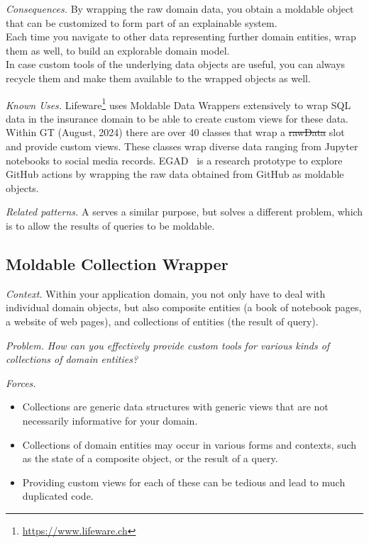 \documentclass[sigconf,screen]{acmart}
\newcommand{\pattern}[2]{\needlines{10}
\subsection*{#1}\label{pat:#2}}
\newcommand{\patref}[1]{\emph{\nameref{pat:#1}}\xspace}
\newcommand{\patsec}[1]{\noindent\textit{#1.}\xspace}
\begin{document}
\patsec{Consequences}
By wrapping the raw domain data, you obtain a moldable object that can be customized to form part of an explainable system.\\
Each time you navigate to other data representing further domain entities, wrap them as well, to build an explorable domain model.\\
In case custom tools of the underlying data objects are useful, you can always recycle them and make them available to the wrapped objects as well.

\patsec{Known Uses}
Lifeware\footnote{\url{https://www.lifeware.ch}} uses Moldable Data Wrappers extensively to wrap SQL data in the insurance domain to be able to create custom views for these data.
Within GT (August, 2024) there are over 40 classes that wrap a \st{rawData} slot and provide custom views.
These classes wrap diverse data ranging from Jupyter notebooks to social media records.
EGAD~\cite{Vale23a} is a research prototype to explore GitHub actions by wrapping the raw data obtained from GitHub as moldable objects.

\patsec{Related patterns}
A \patref{CollectionWrapper} serves a similar purpose, but solves a different problem, which is to allow the results of queries to be moldable.

\pattern{Moldable Collection Wrapper}{CollectionWrapper}

\patsec{Context}
Within your application domain, you not only have to deal with individual domain objects, but also composite entities (\eg a book of notebook pages, a website of web pages), and collections of entities (\eg the result of query).

\patsec{Problem}
\emph{How can you effectively provide custom tools for various kinds of collections of domain entities?}

\patsec{Forces}
\begin{itemize}[---]
\item Collections are generic data structures with generic views that are not necessarily informative for your domain.
\item Collections of domain entities may occur in various forms and contexts, such as the state of a composite object, or the result of a query.
\item Providing custom views for each of these can be tedious and lead to much duplicated code.
\end{itemize}
\end{document}
